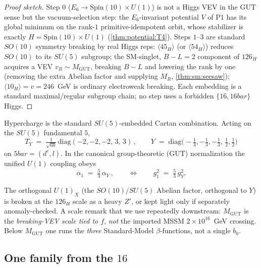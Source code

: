\begin{proof}[Proof sketch]
Step $0$ ($E_6\to \mathrm{Spin}(10)\times U(1)$) is not a Higgs VEV in the GUT sense
but the vacuum-selection step: the $E_6$-invariant potential $V$ of P1 has its global
minimum on the rank-$1$ primitive-idempotent orbit, whose stabilizer is exactly
$H=\mathrm{Spin}(10)\times U(1)$ (\autoref{thm:potential:T4}). Steps $1$--$3$
are standard $SO(10)$ symmetry breaking by real Higgs reps: $\langle 45_H\rangle$ (or
$\langle 54_H\rangle$) reduces $SO(10)$ to its $SU(5)$ subgroup; the SM-singlet,
$B\!-\!L=2$ component of $126_H$ acquires a VEV $v_R\sim M_{\mathrm{GUT}}$, breaking
$B\!-\!L$ and lowering the rank by one (removing the extra Abelian factor and supplying
$M_R$, \autoref{thm:sm:seesaw}); $\langle 10_H\rangle=v=246$~GeV is ordinary
electroweak breaking. Each embedding is a standard maximal/regular subgroup chain;
no step uses a forbidden $\{16,16bar\}$ Higgs.
\end{proof}

\begin{theorem}\label{thm:sm:hypercharge}
Hypercharge is the standard $SU(5)$-embedded Cartan combination. Acting on the
$SU(5)$ fundamental $5$,
\begin{equation}\label{eq:sm:TY}
T_Y \;=\; \tfrac{1}{\sqrt{60}}\,\mathrm{diag}(-2,-2,-2,\,3,\,3)\,,
\qquad
Y \;=\; \mathrm{diag}\!\big(-\tfrac13,-\tfrac13,-\tfrac13,\,\tfrac12,\tfrac12\big)
\end{equation}
on $5bar=(d^c,l)$. In the canonical group-theoretic (GUT) normalization the unified
$U(1)$ coupling obeys
\begin{equation}\label{eq:sm:alpha1}
\alpha_1 \;=\; \tfrac{5}{3}\,\alpha_Y\,,
\qquad\Longleftrightarrow\qquad
g_1^2 \;=\; \tfrac{5}{3}\,g_Y^2 .
\end{equation}
\end{theorem}

The orthogonal $U(1)_X$ (the $SO(10)/SU(5)$ Abelian factor, orthogonal to $Y$) is
broken at the $126_H$ scale as a heavy $Z'$, or kept light only if separately
anomaly-checked. A scale remark that we use repeatedly downstream: $M_{\mathrm{GUT}}$
is the \emph{breaking-VEV scale tied to $f$}, \emph{not} the imported MSSM
$2\times10^{16}$~GeV crossing. Below $M_{\mathrm{GUT}}$ one runs the \emph{three}
Standard-Model $\beta$-functions, not a single $b_0$.

\subsection{One family from the \texorpdfstring{$16$}{16}}
\label{sec:sm:family}

